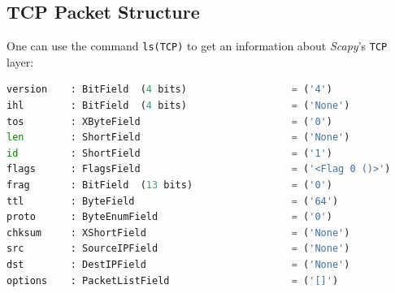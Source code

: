 \subsection{TCP Packet Structure}
\label{apx:tcp}

One can use the command \lstinline{ls(TCP)} to get an information about \textit{Scapy}'s \cite{scapy2024} \lstinline{TCP} layer:

\begin{lstlisting}[language=python, caption=Scapy TCP Layer]
version    : BitField  (4 bits)                  = ('4')
ihl        : BitField  (4 bits)                  = ('None')
tos        : XByteField                          = ('0')
len        : ShortField                          = ('None')
id         : ShortField                          = ('1')
flags      : FlagsField                          = ('<Flag 0 ()>')
frag       : BitField  (13 bits)                 = ('0')
ttl        : ByteField                           = ('64')
proto      : ByteEnumField                       = ('0')
chksum     : XShortField                         = ('None')
src        : SourceIPField                       = ('None')
dst        : DestIPField                         = ('None')
options    : PacketListField                     = ('[]')
\end{lstlisting}

